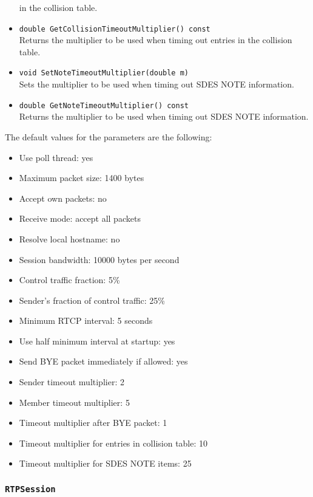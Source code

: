 \documentclass[12pt,a4paper]{article}
\newcommand{\headerfile}[1]{\marginpar{\scriptsize Header:\\{\tt #1}}}
\begin{document}
\begin{itemize}
						in the collision table.
					\item {\tt double GetCollisionTimeoutMultiplier() const}\\
						Returns the multiplier to be used when timing out entries
						in the collision table.
					\item {\tt void SetNoteTimeoutMultiplier(double m)}\\
						Sets the multiplier to be used when timing out SDES NOTE
						information.
					\item {\tt double GetNoteTimeoutMultiplier() const}\\
						Returns the multiplier to be used when timing out SDES NOTE
						information.
				\end{itemize}

				The default values for the parameters are the following:
				\begin{itemize}
					\item Use poll thread: yes
					\item Maximum packet size: 1400 bytes
					\item Accept own packets: no
					\item Receive mode: accept all packets
					\item Resolve local hostname: no
					\item Session bandwidth: 10000 bytes per second
					\item Control traffic fraction: 5\%
					\item Sender's fraction of control traffic: 25\%
					\item Minimum RTCP interval: 5 seconds
					\item Use half minimum interval at startup: yes
					\item Send BYE packet immediately if allowed: yes
					\item Sender timeout multiplier: 2
					\item Member timeout multiplier: 5
					\item Timeout multiplier after BYE packet: 1
					\item Timeout multiplier for entries in collision table: 10
					\item Timeout multiplier for SDES NOTE items: 25
				\end{itemize}

			\subsubsection{\tt RTPSession}\headerfile{rtpsession.h}
			\label{rtpsession}
			
\end{document}
